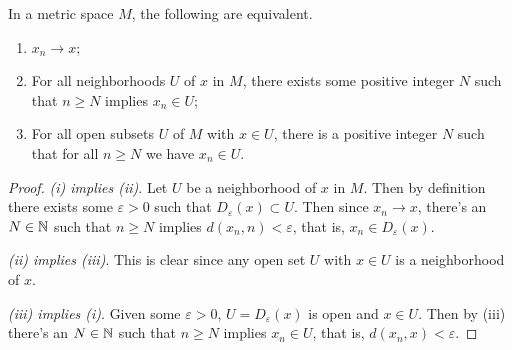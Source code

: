 \documentclass[a4paper]{scrartcl}
\begin{document}
\begin{proposition}
    In a metric space $M$, the following are equivalent.
    \begin{enumerate}[label=(\roman*)]
        \item $x_n \rightarrow x$;
        \item For all neighborhoods $U$ of $x$ in $M$, there exists some positive integer $N$ such that $n \geq N$ implies $x_n \in U$;
        \item For all open subsets $U$ of $M$ with $x \in U$, there is a positive integer $N$ such that for all $n \geq N$ we have $x_n \in U$.
    \end{enumerate}
\end{proposition}
\begin{proof}
    \emph{(i) implies (ii)}. Let $U$ be a neighborhood of $x$ in $M$. Then by definition there exists some $\varepsilon > 0$ such that $D_{\varepsilon}(x) \subset U$. Then since $x_n \rightarrow x$, there's an $N \in \mathbb{N}$ such that $n \geq N$ implies $d(x_n, n) < \varepsilon$, that is, $x_n \in D_{\varepsilon}(x)$. 

    \emph{(ii) implies (iii)}. This is clear since any open set $U$ with $x \in U$ is a neighborhood of $x$.

    \emph{(iii) implies (i)}. Given some $\varepsilon > 0$, $U = D_{\varepsilon}(x)$ is open and $x \in U$. Then by (iii) there's an $N \in \mathbb{N}$ such that $n \geq N$ implies $x_n \in U$, that is, $d(x_n, x) < \varepsilon$.
\end{proof}
\end{document}
